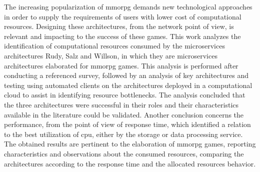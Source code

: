 The increasing popularization of \acf{mmorpg} demands new technological approaches in order to supply the requirements of users with lower cost of computational resources.
%
Designing these architectures, from the network point of view, is relevant and impacting to the success of these games.
%
This work analyzes the identification of computational resources consumed by the microservices architectures Rudy, Salz and Willson, in which they are microservices architectures elaborated for \ac{mmorpg} games.
%
This analysis is performed after conducting a referenced survey, followed by an analysis of key architectures and testing using automated clients on the architectures deployed in a computational cloud to assist in identifying resource bottlenecks.
%
The analysis concluded that the three architectures were successful in their roles and their characteristics available in the literature could be validated.
%
Another conclusion concerns the performance, from the point of view of response time, which identified a relation to the best utilization of \ac{cpu}, either by the storage or data processing service.
%
The obtained results are pertinent to the elaboration of \ac{mmorpg} games, reporting characteristics and observations about the consumed resources, comparing the architectures according to the response time and the allocated resources behavior.
%
